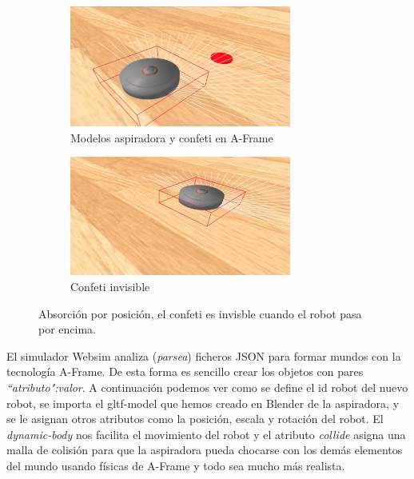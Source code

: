     
\begin{figure}[H]
  \begin{subfigure}[b]{0.5\textwidth}
  \centering
    \includegraphics[width=0.8\textwidth, height=0.5\textwidth]{chapters/images/prototiporoomba.png}
    \caption{Modelos aspiradora y confeti en A-Frame}
    \label{fig:f1}
  \end{subfigure}
  \hfill
  \begin{subfigure}[b]{0.5\textwidth}
  \centering
    \includegraphics[width=0.8\textwidth, height=0.5\textwidth]{chapters/images/prototiporoomba2.png}
	\caption{Confeti invisible}    
    \label{fig:f2}
 
  \end{subfigure}
  \caption{Absorción por posición, el confeti es invisble cuando el robot pasa por encima.}
\end{figure}

El simulador Websim analiza (\textit{parsea}) ficheros JSON para formar mundos con la tecnología A-Frame. De esta forma es sencillo crear los objetos con pares \textit{``atributo":valor}. A continuación podemos ver como se define el id robot del nuevo robot, se importa el gltf-model que hemos creado en Blender de la aspiradora, y se le asignan otros atributos como la posición, escala y rotación del robot. El \textit{dynamic-body} nos facilita el movimiento del robot y el atributo \textit{collide} asigna una malla de colisión para que la aspiradora pueda chocarse con los demás elementos del mundo usando físicas de A-Frame y todo sea mucho más realista.

